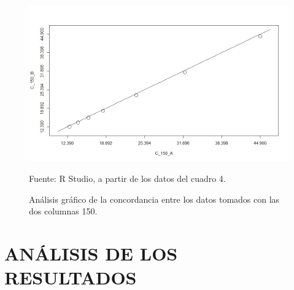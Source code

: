\documentclass[12, letterpaper]{article}
\begin{document}
\begin{landscape}
\begin{figure}[H]
	\centering
	\includegraphics[width=1\columnwidth]{figura_6.png}
	\caption{Análisis gráfico de la concordancia entre los datos tomados con las dos columnas 150.}
	Fuente: R Studio, a partir de los datos del cuadro 4.
    \label{figura6}
\end{figure}

\end{landscape}

\section{ANÁLISIS DE LOS RESULTADOS}
\end{document}
